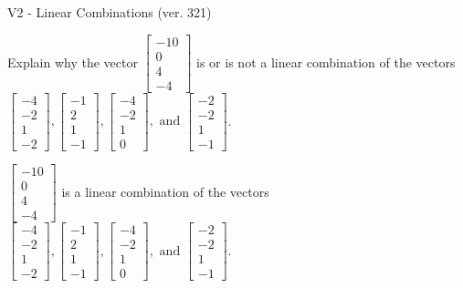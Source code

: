 \begin{exercise}
  \begin{exerciseTitle}V2 - Linear Combinations (ver. 321)\end{exerciseTitle}
  \begin{exerciseStatement}
    Explain why the vector \(\left[\begin{array}{c}
-10 \\
0 \\
4 \\
-4
\end{array}\right]\)  is or is not a linear 
	combination of the vectors \(\left[\begin{array}{c}
-4 \\
-2 \\
1 \\
-2
\end{array}\right] , \left[\begin{array}{c}
-1 \\
2 \\
1 \\
-1
\end{array}\right] , \left[\begin{array}{c}
-4 \\
-2 \\
1 \\
0
\end{array}\right] , \text{ and } \left[\begin{array}{c}
-2 \\
-2 \\
1 \\
-1
\end{array}\right]\).
	


  \end{exerciseStatement}
  \begin{exerciseAnswer}
   \(\left[\begin{array}{c}
-10 \\
0 \\
4 \\
-4
\end{array}\right]\) 
  	 is  
	a linear combination of the vectors \(\left[\begin{array}{c}
-4 \\
-2 \\
1 \\
-2
\end{array}\right] , \left[\begin{array}{c}
-1 \\
2 \\
1 \\
-1
\end{array}\right] , \left[\begin{array}{c}
-4 \\
-2 \\
1 \\
0
\end{array}\right] , \text{ and } \left[\begin{array}{c}
-2 \\
-2 \\
1 \\
-1
\end{array}\right]\).


\end{exerciseAnswer}
\end{exercise}
